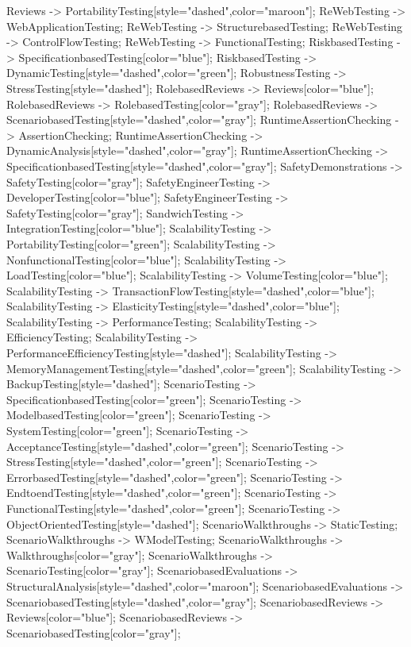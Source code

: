 \documentclass{article}
\begin{document}
{Reviews -> PortabilityTesting[style="dashed",color="maroon"];
ReWebTesting -> WebApplicationTesting;
ReWebTesting -> StructurebasedTesting;
ReWebTesting -> ControlFlowTesting;
ReWebTesting -> FunctionalTesting;
RiskbasedTesting -> SpecificationbasedTesting[color="blue"];
RiskbasedTesting -> DynamicTesting[style="dashed",color="green"];
RobustnessTesting -> StressTesting[style="dashed"];
RolebasedReviews -> Reviews[color="blue"];
RolebasedReviews -> RolebasedTesting[color="gray"];
RolebasedReviews -> ScenariobasedTesting[style="dashed",color="gray"];
RuntimeAssertionChecking -> AssertionChecking;
RuntimeAssertionChecking -> DynamicAnalysis[style="dashed",color="gray"];
RuntimeAssertionChecking -> SpecificationbasedTesting[style="dashed",color="gray"];
SafetyDemonstrations -> SafetyTesting[color="gray"];
SafetyEngineerTesting -> DeveloperTesting[color="blue"];
SafetyEngineerTesting -> SafetyTesting[color="gray"];
SandwichTesting -> IntegrationTesting[color="blue"];
ScalabilityTesting -> PortabilityTesting[color="green"];
ScalabilityTesting -> NonfunctionalTesting[color="blue"];
ScalabilityTesting -> LoadTesting[color="blue"];
ScalabilityTesting -> VolumeTesting[color="blue"];
ScalabilityTesting -> TransactionFlowTesting[style="dashed",color="blue"];
ScalabilityTesting -> ElasticityTesting[style="dashed",color="blue"];
ScalabilityTesting -> PerformanceTesting;
ScalabilityTesting -> EfficiencyTesting;
ScalabilityTesting -> PerformanceEfficiencyTesting[style="dashed"];
ScalabilityTesting -> MemoryManagementTesting[style="dashed",color="green"];
ScalabilityTesting -> BackupTesting[style="dashed"];
ScenarioTesting -> SpecificationbasedTesting[color="green"];
ScenarioTesting -> ModelbasedTesting[color="green"];
ScenarioTesting -> SystemTesting[color="green"];
ScenarioTesting -> AcceptanceTesting[style="dashed",color="green"];
ScenarioTesting -> StressTesting[style="dashed",color="green"];
ScenarioTesting -> ErrorbasedTesting[style="dashed",color="green"];
ScenarioTesting -> EndtoendTesting[style="dashed",color="green"];
ScenarioTesting -> FunctionalTesting[style="dashed",color="green"];
ScenarioTesting -> ObjectOrientedTesting[style="dashed"];
ScenarioWalkthroughs -> StaticTesting;
ScenarioWalkthroughs -> WModelTesting;
ScenarioWalkthroughs -> Walkthroughs[color="gray"];
ScenarioWalkthroughs -> ScenarioTesting[color="gray"];
ScenariobasedEvaluations -> StructuralAnalysis[style="dashed",color="maroon"];
ScenariobasedEvaluations -> ScenariobasedTesting[style="dashed",color="gray"];
ScenariobasedReviews -> Reviews[color="blue"];
ScenariobasedReviews -> ScenariobasedTesting[color="gray"];
}
\end{document}
